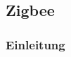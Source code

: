 \vspace*{4cm}
\begin{center}
\part{Zigbee}
\end{center}
\vspace*{\fill}
\clearpage

\section{Einleitung}\label{sec:EinleitungZigbee}







